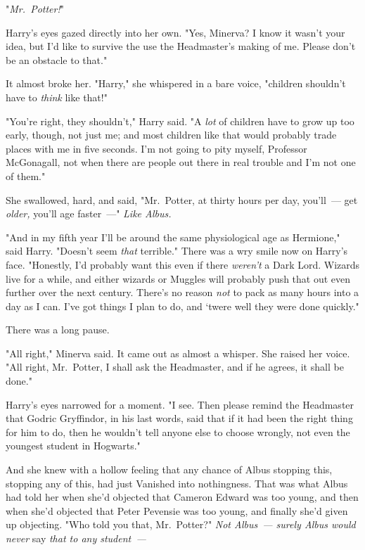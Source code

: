 "\emph{Mr.~Potter!}"

Harry's eyes gazed directly into her own. "Yes, Minerva? I know it wasn't your
idea, but I'd like to survive the use the Headmaster's making of me. Please
don't be an obstacle to that."

It almost broke her. "Harry," she whispered in a bare voice, "children
shouldn't have to \emph{think} like that!"

"You're right, they shouldn't," Harry said. "A \emph{lot} of children have to
grow up too early, though, not just me; and most children like that would
probably trade places with me in five seconds. I'm not going to pity myself,
Professor McGonagall, not when there are people out there in real trouble and
I'm not one of them."

She swallowed, hard, and said, "Mr.~Potter, at thirty hours per day,
you'll~--- get \emph{older,} you'll age faster~---" \emph{Like Albus.}

"And in my fifth year I'll be around the same physiological age as Hermione,"
said Harry. "Doesn't seem \emph{that} terrible." There was a wry smile now on
Harry's face. "Honestly, I'd probably want this even if there \emph{weren't} a
Dark Lord. Wizards live for a while, and either wizards or Muggles will
probably push that out even further over the next century. There's no reason
\emph{not} to pack as many hours into a day as I can. I've got things I plan to
do, and `twere well they were done quickly."

There was a long pause.

"All right," Minerva said. It came out as almost a whisper. She raised her
voice. "All right, Mr.~Potter, I shall ask the Headmaster, and if he agrees, it
shall be done."

Harry's eyes narrowed for a moment. "I see. Then please remind the Headmaster
that Godric Gryffindor, in his last words, said that if it had been the right
thing for him to do, then he wouldn't tell anyone else to choose wrongly, not
even the youngest student in Hogwarts."

And she knew with a hollow feeling that any chance of Albus stopping this,
stopping any of this, had just Vanished into nothingness. That was what Albus
had told her when she'd objected that Cameron Edward was too young, and then
when she'd objected that Peter Pevensie was too young, and finally she'd given
up objecting. "Who told you that, Mr.~Potter?" \emph{Not Albus~--- surely Albus
would never} say \emph{that to any student~--- }

